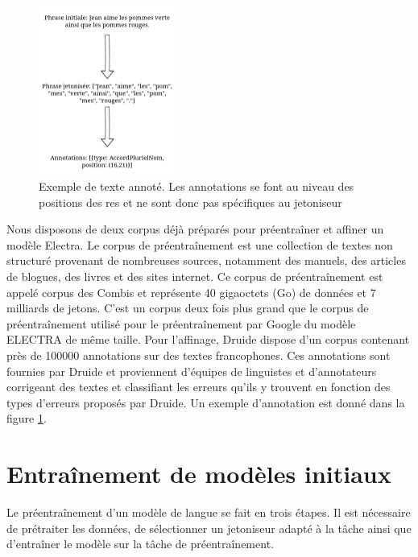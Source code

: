 \documentclass[12pt,twoside,rapport]{dms}
\theoremstyle{definition}
\numberwithin{equation}{section}
\numberwithin{table}{chapter}
\numberwithin{figure}{chapter}
\begin{document}
\begin{figure}[h!]
	\begin{center}
		\includegraphics[width=0.4\textwidth]{figures/annotation.png}
	\end{center}
	\caption{Exemple de texte annoté. Les annotations se font au niveau des positions des res et ne sont donc pas spécifiques au jetoniseur}
	\label{fig:ex_annotation}
\end{figure}

Nous disposons de deux corpus déjà préparés pour préentraîner et affiner un
modèle Electra. Le corpus de préentraînement est une collection de textes non
structuré provenant de nombreuses sources, notamment des manuels, des articles
de blogues, des livres et des sites internet. Ce corpus de préentraînement est
appelé corpus des Combis et représente 40 gigaoctets (Go) de données et 7
milliards de jetons. C'est un corpus deux fois plus grand que le corpus de
préentraînement utilisé pour le préentraînement par Google du modèle ELECTRA de
même taille. Pour l'affinage, Druide dispose d'un corpus contenant près de
100000 annotations sur des textes francophones. Ces annotations sont fournies
par Druide et proviennent d'équipes de linguistes et d'annotateurs
corrigeant des textes et classifiant les erreurs qu'ils y trouvent en
fonction des types d'erreurs proposés par Druide. Un exemple
d'annotation est donné dans la figure \ref{fig:ex_annotation}.


\chapter{Entraînement de modèles initiaux}
Le préentraînement d'un modèle de langue se fait en trois étapes. Il est
nécessaire de prétraiter les données, de sélectionner un jetoniseur adapté à
la tâche ainsi que d'entraîner le modèle sur la tâche de préentraînement.
\end{document}
